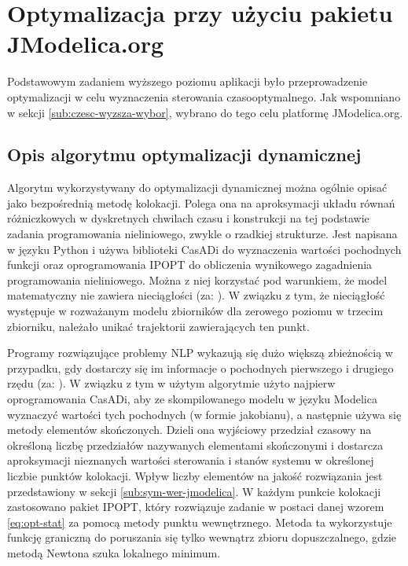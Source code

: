 \section{Optymalizacja przy użyciu pakietu JModelica.org}
\label{sec:opt}

Podstawowym zadaniem wyższego poziomu aplikacji było przeprowadzenie optymalizacji w celu wyznaczenia sterowania czasooptymalnego. Jak wspomniano w sekcji \ref{sub:czesc-wyzsza-wybor}, wybrano do tego celu platformę JModelica.org.

\subsection{Opis algorytmu optymalizacji dynamicznej}
\label{sub:opt-alg}

Algorytm wykorzystywany do optymalizacji dynamicznej można ogólnie opisać jako bezpośrednią metodę kolokacji. Polega ona na aproksymacji układu równań różniczkowych w dyskretnych chwilach czasu i konstrukcji na tej podstawie zadania programowania nieliniowego, zwykle o rzadkiej strukturze. Jest napisana w języku Python i używa biblioteki CasADi do wyznaczenia wartości pochodnych funkcji oraz oprogramowania IPOPT do obliczenia wynikowego zagadnienia programowania nieliniowego. Można z niej korzystać pod warunkiem, że model matematyczny nie zawiera nieciągłości (za: \cite{JModelicaUserGuide}). W związku z tym, że nieciągłość występuje w rozważanym modelu zbiorników dla zerowego poziomu w trzecim zbiorniku, należało unikać trajektorii zawierających ten punkt.

Programy rozwiązujące problemy NLP wykazują się dużo większą zbieżnością w przypadku, gdy dostarczy się im informacje o pochodnych pierwszego i drugiego rzędu (za: \cite{and+11mod11}). W związku z tym w użytym algorytmie użyto najpierw oprogramowania CasADi, aby ze skompilowanego modelu w języku Modelica wyznaczyć wartości tych pochodnych (w formie jakobianu), a następnie używa się metody elementów skończonych. Dzieli ona wyjściowy przedział czasowy na określoną liczbę przedziałów nazywanych elementami skończonymi i dostarcza aproksymacji nieznanych wartości sterowania i stanów systemu w określonej liczbie punktów kolokacji. Wpływ liczby elementów na jakość rozwiązania jest przedstawiony w sekcji \ref{sub:sym-wer-jmodelica}.
W każdym punkcie kolokacji zastosowano pakiet IPOPT, który rozwiązuje zadanie w postaci danej wzorem \ref{eq:opt-stat} za pomocą metody punktu wewnętrznego. Metoda ta wykorzystuje funkcję graniczną do poruszania się tylko wewnątrz zbioru dopuszczalnego, gdzie metodą Newtona szuka lokalnego minimum.

